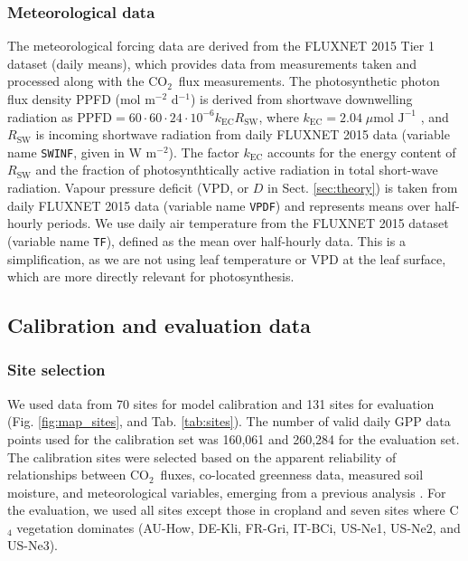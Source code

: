 \documentclass{myreport}
\newcommand{\coo}{CO$_2$}
\begin{document}
\subsubsection{Meteorological data}
\label{sec:ppfd}
The meteorological forcing data are derived from the FLUXNET 2015 Tier 1 dataset (daily means), which provides data from measurements taken and processed along with the \coo\ flux measurements. The photosynthetic photon flux density PPFD (mol m$^{-2}$ d$^{-1}$) is derived from shortwave downwelling radiation as $\text{PPFD} = 60 \cdot 60 \cdot 24 \cdot 10^{-6} k_\text{EC} R_{\text{SW}}$, where $k_\text{EC} = 2.04\; \mu \text{mol J}^{-1}$ \citep{meek84}, and $R_{\text{SW}}$ is incoming shortwave radiation from daily FLUXNET 2015 data (variable name \texttt{SW\textunderscore IN\textunderscore F}, given in W m$^{-2}$). The factor $k_\text{EC}$ accounts for the energy content of $R_\text{SW}$ and the fraction of photosynthtically active radiation in total short-wave radiation. Vapour pressure deficit (VPD, or $D$ in Sect. \ref{sec:theory}) is taken from daily FLUXNET 2015 data (variable name \texttt{VPD\textunderscore F}) and represents means over half-hourly periods. We use daily air temperature from the FLUXNET 2015 dataset (variable name \texttt{T\textunderscore F}), defined as the mean over half-hourly data. This is a simplification, as we are not using leaf temperature or VPD at the leaf surface, which are more directly relevant for photosynthesis. %

\subsection{Calibration and evaluation data}

\label{sec:calibdata}

\subsubsection{Site selection}
We used data from 70 sites for model calibration and 131 sites for evaluation (Fig. \ref{fig:map_sites}, and Tab. \ref{tab:sites}). The number of valid daily GPP data points used for the calibration set was 160,061 and 260,284 for the evaluation set. The calibration sites were selected based on the apparent reliability of relationships between \coo\ fluxes, co-located greenness data, measured soil moisture, and meteorological variables, emerging from a previous analysis \citep{stocker18newphyt}. For the evaluation, we used all sites except those in cropland and seven sites where  C$_4$ vegetation dominates (AU-How, DE-Kli, FR-Gri, IT-BCi, US-Ne1, US-Ne2, and US-Ne3).
\end{document}
